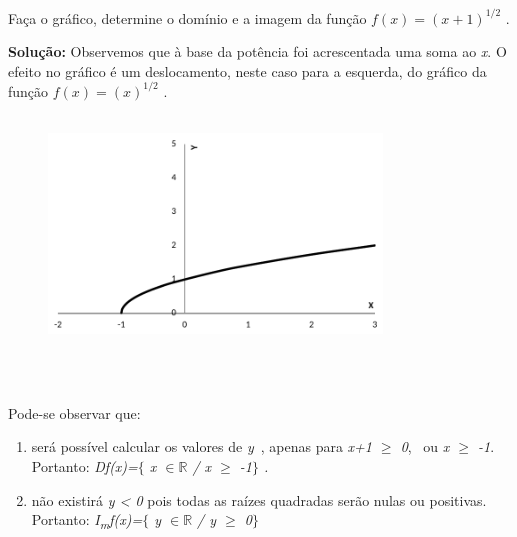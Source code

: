 \begin{texemplo}
	
Faça o gráfico, determine o domínio e a imagem da função  \( f \left( x \right) = \left( x+1 \right) ^{1/2} \) .

\textbf{Solução:} Observemos que à base da potência foi acrescentada uma soma ao \textit{x}. O efeito no gráfico é um deslocamento, neste caso para a esquerda, do gráfico da função  \( f \left( x \right) = \left( x \right) ^{1/2} \) .

\begin{figure}[H]
	\begin{Center}
		\includegraphics[width=3.49in,height=2.46in]{capitulos/outras_funcoes/media/image8.pdf}
	\end{Center}
\end{figure}

~~

Pode-se observar que: 

\begin{enumerate}
	\item será possível calcular os valores de \textit{y}~, apenas para  \textit{x+1 $ \geq $  0},~ ou \textit{x $ \geq $  -1}. Portanto: \textit{Df(x)=$ \{ $  x $ \in \mathbb{R} $  \textbf{ }/ x $ \geq $  -1$ \} $ .}

	\item  não existirá \textit{y < 0} pois todas as raízes quadradas serão nulas ou positivas. Portanto: \textit{I\textsubscript{m}f(x)=$ \{ $ y $ \in \mathbb{R} $   / y $ \geq $  0$ \} $  }\qedsymbol{} 
\end{enumerate}
\end{texemplo}

